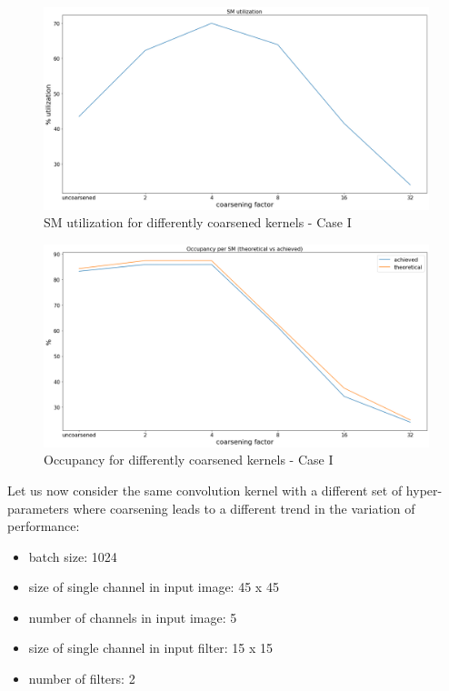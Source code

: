 \begin{figure}[ht]
	\centering
	\includegraphics[scale=0.30]{Pictures/plots/good_improvement_coarsening/sm util.png}
	\caption{\small SM utilization for differently coarsened kernels - Case I}
\end{figure}

\begin{figure}[ht]
	\centering
	\includegraphics[scale=0.30]{Pictures/plots/good_improvement_coarsening/occupancy.png}
	\caption{\small Occupancy for differently coarsened kernels - Case I}
\end{figure}


Let us now consider the same convolution kernel with a different set of hyper-parameters where coarsening leads to a different trend in the variation of performance:


\begin{itemize}
\item batch size: 1024
\item size of single channel in input image: 45 x 45
\item number of channels in input image: 5
\item size of single channel in input filter: 15 x 15
\item number of filters: 2
\end{itemize}

